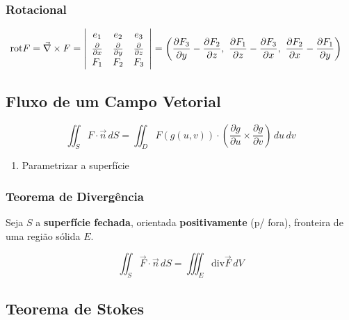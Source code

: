 \documentclass[11pt, a4paper]{article}
\begin{document}
\subsubsection{Rotacional}

\begin{align*}
    \text{rot} F = \vec{\nabla} \times F & =
    \left\vert
    \begin{array}{c c c}
        e_1                         & e_2 & e_3 \\[2pt]
        \frac{\partial}{\partial x} &
        \frac{\partial}{\partial y} &
        \frac{\partial}{\partial z}             \\[2pt]
        F_1                         & F_2 & F_3
    \end{array}
    \right\vert
    = \left(\frac{\partial F_3}{\partial y} - \frac{\partial F_2}{\partial z}
    ,\ \frac{\partial F_1}{\partial z} - \frac{\partial F_3}{\partial x}
    ,\ \frac{\partial F_2}{\partial x} - \frac{\partial F_1}{\partial y}
    \right)
\end{align*}

\subsection{Fluxo de um Campo Vetorial}

\begin{equation*}
    \iint_S F \cdot \vec{n} \, dS =
    \iint_D F(g(u, v)) \cdot
    \left(
    \frac{\partial g}{\partial u} \times \frac{\partial g}{\partial v}
    \right) \, du\,dv
\end{equation*}

\begin{enumerate}
    \item Parametrizar a superfície
\end{enumerate}

\subsubsection{Teorema de Divergência}

Seja $S$ a \textbf{superfície fechada}, orientada \textbf{positivamente} (p/
fora), fronteira de uma região sólida $E$.

\begin{equation*}
    \iint_S \vec{F} \cdot \vec{n} \, dS =
    \iiint_E \text{div} \vec{F} \, dV
\end{equation*}

\subsection{Teorema de Stokes}
\end{document}
